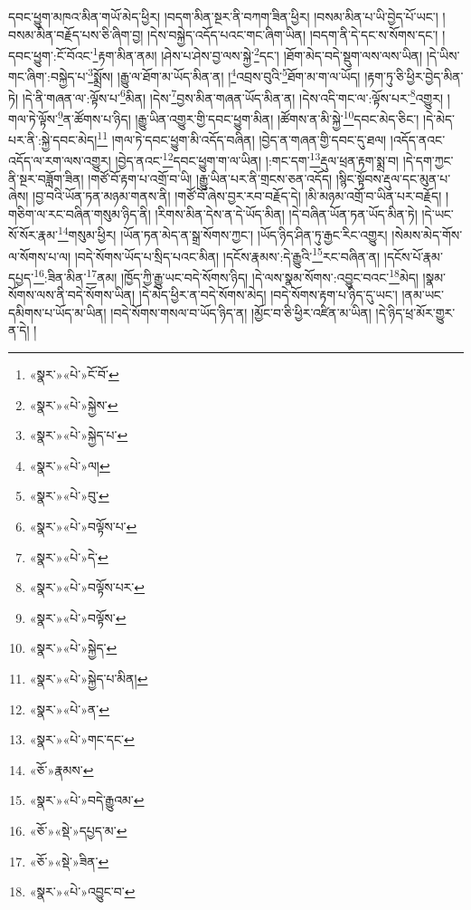 དབང་ཕྱུག་མཁའ་མིན་གཡོ་མེད་ཕྱིར། །བདག་མིན་སྔར་ནི་བཀག་ཟིན་ཕྱིར། །བསམ་མིན་པ་ཡི་བྱེད་པོ་ཡང་། །བསམ་མིན་བརྗོད་པས་ཅི་ཞིག་བྱ། །དེས་བསྐྱེད་འདོད་པའང་གང་ཞིག་ཡིན། །བདག་ནི་དེ་དང་ས་སོགས་དང་། །དབང་ཕྱུག་:ངོ་བོའང་\footnote{«སྣར་»«པེ་»ངོ་བོ་}རྟག་མིན་ནམ། །ཤེས་པ་ཤེས་བྱ་ལས་སྐྱེ་\footnote{«སྣར་»«པེ་»སྐྱེས་}དང་། །ཐོག་མེད་བདེ་སྡུག་ལས་ལས་ཡིན། །དེ་ཡིས་གང་ཞིག་:བསྐྱེད་པ་\footnote{«སྣར་»«པེ་»སྐྱེད་པ་}སྨྲོས། །རྒྱུ་ལ་ཐོག་མ་ཡོད་མིན་ན། །\footnote{«སྣར་»«པེ་»ལ། }འབྲས་བུའི་\footnote{«སྣར་»«པེ་»བུ་}ཐོག་མ་ག་ལ་ཡོད། །རྟག་ཏུ་ཅི་ཕྱིར་བྱེད་མིན་ཏེ། །དེ་ནི་གཞན་ལ་:ལྟོས་པ་\footnote{«སྣར་»«པེ་»བལྟོས་པ་}མིན། །དེས་\footnote{«སྣར་»«པེ་»དེ་}བྱས་མིན་གཞན་ཡོད་མིན་ན། །དེས་འདི་གང་ལ་:ལྟོས་པར་\footnote{«སྣར་»«པེ་»བལྟོས་པར་}འགྱུར། །གལ་ཏེ་ལྟོས་\footnote{«སྣར་»«པེ་»བལྟོས་}ན་ཚོགས་པ་ཉིད། །རྒྱུ་ཡིན་འགྱུར་གྱི་དབང་ཕྱུག་མིན། །ཚོགས་ན་མི་སྐྱེ་\footnote{«སྣར་»«པེ་»སྐྱེད་}དབང་མེད་ཅིང་། །དེ་མེད་པར་ནི་:སྐྱེ་དབང་མེད།\footnote{«སྣར་»«པེ་»སྐྱེད་པ་མིན།} །གལ་ཏེ་དབང་ཕྱུག་མི་འདོད་བཞིན། །བྱེད་ན་གཞན་གྱི་དབང་དུ་ཐལ། །འདོད་ནའང་འདོད་ལ་རག་ལས་འགྱུར། །བྱེད་ནའང་\footnote{«སྣར་»«པེ་»ན་}དབང་ཕྱུག་ག་ལ་ཡིན། །:གང་དག་\footnote{«སྣར་»«པེ་»གང་དང་}རྡུལ་ཕྲན་རྟག་སྨྲ་བ། །དེ་དག་ཀྱང་ནི་སྔར་བཟློག་ཟིན། །གཙོ་བོ་རྟག་པ་འགྲོ་བ་ཡི། །རྒྱུ་ཡིན་པར་ནི་གྲངས་ཅན་འདོད། །སྙིང་སྟོབས་རྡུལ་དང་མུན་པ་ཞེས། །བྱ་བའི་ཡོན་ཏན་མཉམ་གནས་ནི། །གཙོ་བོ་ཞེས་བྱར་རབ་བརྗོད་དེ། །མི་མཉམ་འགྲོ་བ་ཡིན་པར་བརྗོད། །གཅིག་ལ་རང་བཞིན་གསུམ་ཉིད་ནི། །རིགས་མིན་དེས་ན་དེ་ཡོད་མིན། །དེ་བཞིན་ཡོན་ཏན་ཡོད་མིན་ཏེ། །དེ་ཡང་སོ་སོར་རྣམ་\footnote{«ཅོ་»རྣམས་}གསུམ་ཕྱིར། །ཡོན་ཏན་མེད་ན་སྒྲ་སོགས་ཀྱང་། །ཡོད་ཉིད་ཤིན་ཏུ་རྒྱང་རིང་འགྱུར། །སེམས་མེད་གོས་ལ་སོགས་པ་ལ། །བདེ་སོགས་ཡོད་པ་སྲིད་པའང་མིན། །དངོས་རྣམས་:དེ་རྒྱུའི་\footnote{«སྣར་»«པེ་»བདེ་རྒྱུའམ་}རང་བཞིན་ན། །དངོས་པོ་རྣམ་དཔྱད་\footnote{«ཅོ་»«སྡེ་»དཔྱད་མ་}:ཟིན་མིན་\footnote{«ཅོ་»«སྡེ་»ཟིན་}ནམ། །ཁྱོད་ཀྱི་རྒྱུ་ཡང་བདེ་སོགས་ཉིད། །དེ་ལས་སྣམ་སོགས་:འབྱུང་བའང་\footnote{«སྣར་»«པེ་»འབྱུང་བ་}མེད། །སྣམ་སོགས་ལས་ནི་བདེ་སོགས་ཡིན། །དེ་མེད་ཕྱིར་ན་བདེ་སོགས་མེད། །བདེ་སོགས་རྟག་པ་ཉིད་དུ་ཡང་། །ནམ་ཡང་དམིགས་པ་ཡོད་མ་ཡིན། །བདེ་སོགས་གསལ་བ་ཡོད་ཉིད་ན། །མྱོང་བ་ཅི་ཕྱིར་འཛིན་མ་ཡིན། །དེ་ཉིད་ཕྲ་མོར་གྱུར་ན་དེ། །
